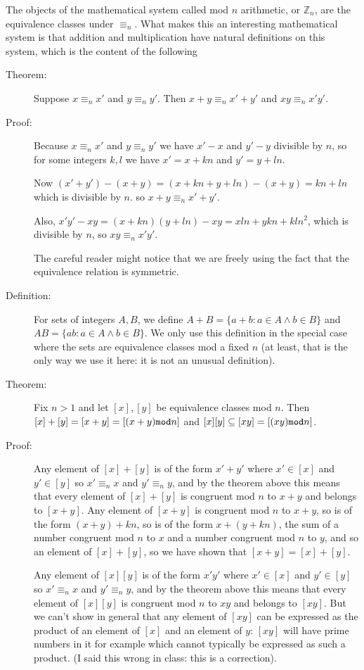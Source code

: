 \documentclass[12pt]{article}
\begin{document}
The objects of the mathematical system called mod $n$ arithmetic, or ${\mathbb Z}_n$, are the equivalence classes
under $\equiv_n$.  What makes this an interesting mathematical system is that addition and multiplication have natural definitions on this system, which is the content of the following

\begin{description}

\item[Theorem:]  Suppose $x \equiv_n x'$ and $y \equiv_n y'$.  Then $x+y \equiv_n x'+y'$ and $xy \equiv_n x'y'$.

\item[Proof:]  Because $x \equiv_n x'$ and $y \equiv_n y'$ we have $x'-x$ and $y'-y$ divisible by $n$, so for some integers $k,l$ we have $x'=x+kn$ and $y'=y+ln$.

Now $(x'+y') - (x+y) = (x+kn+y+ln)-(x+y) = kn+ln$ which is divisible by $n$.  so $x+y \equiv_n x'+y'$.

Also, $x'y' - xy = (x+kn)(y+ln) - xy = xln + ykn+kln^2$, which is divisible by $n$, so $xy\equiv_n x'y'$.

The careful reader might notice that we are freely using the fact that the equivalence relation is symmetric.

\item[Definition:]  For sets of integers $A,B$, we define  $A+B = \{a +b:a \in A \wedge b \in B\}$ and $AB = \{ab:a \in A \wedge b \in B\}$.  We only use this definition in the special case where the sets are equivalence classes mod a fixed $n$ (at least, that is the only way we use it here:  it is not an unusual definition).

\item[Theorem:]  Fix $n>1$ and let $[x], [y]$ be equivalence classes mod $n$.  Then $[x]+[y] = [x+y] = [(x+y){\tt mod}n]$ and   $[x][y] \subseteq [xy] = [(xy){\tt mod}n]$.

\item[Proof:]  Any element of $[x]+[y]$ is of the form $x'+y'$ where $x' \in [x]$ and $y' \in [y]$ so $x' \equiv_n x$ and $y'\equiv_n y$, and by the theorem above this means that every element of $[x]+[y]$ is congruent mod $n$ to $x+y$ and belongs to $[x+y]$.  Any element of $[x+y]$ is congruent mod $n$ to $x+y$, so is of the form $(x+y)+kn$,
so is of the form $x+(y+kn)$, the sum of a number congruent mod $n$ to $x$ and a number congruent mod $n$ to $y$, and so an element of $[x]+[y]$, so we have shown that $[x+y]=[x]+[y]$.

Any element of $[x][y]$ is of the form $x'y'$ where $x' \in [x]$ and $y' \in [y]$ so $x' \equiv_n x$ and $y'\equiv_n y$, and by the theorem above this means that every element of $[x][y]$ is congruent mod $n$ to $xy$ and belongs to $[xy]$.  But we can't show in general that any element of $[xy]$ can be expressed as the product of an element of $[x]$ and an element of $y$:  $[xy]$ will have prime numbers in it for example which cannot typically be expressed as such a product.  (I said this wrong in class:  this is a correction).


\end{description}
\end{document}
